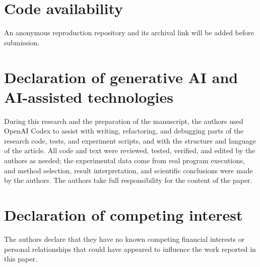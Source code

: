 \documentclass[5p,twocolumn,authoryear]{elsarticle}
\begin{document}
\section*{Code availability}
An anonymous reproduction repository and its archival link will be added before
submission.

\section*{Declaration of generative AI and AI-assisted technologies}
During this research and the preparation of the manuscript, the authors used OpenAI Codex
to assist with writing, refactoring, and debugging parts of the research code, tests, and
experiment scripts, and with the structure and language of the article. All code and text
were reviewed, tested, verified, and edited by the authors as needed; the experimental
data come from real program executions, and method selection, result interpretation, and
scientific conclusions were made by the authors. The authors take full responsibility for
the content of the paper.

\section*{Declaration of competing interest}
The authors declare that they have no known competing financial interests or personal
relationships that could have appeared to influence the work reported in this paper.



\end{document}
